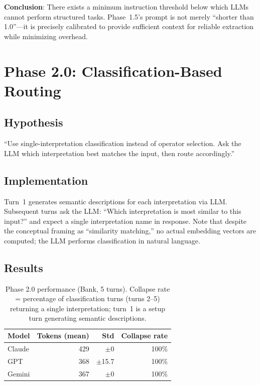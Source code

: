 \documentclass[11pt,a4paper]{article}
\begin{document}
\textbf{Conclusion}: There exists a minimum instruction threshold below which
LLMs cannot perform structured tasks. Phase~1.5's prompt is not merely
``shorter than 1.0''---it is precisely calibrated to provide sufficient context
for reliable extraction while minimizing overhead.

\section{Phase 2.0: Classification-Based Routing}
\label{sec:phase2_0}

\subsection{Hypothesis}

``Use single-interpretation classification instead of operator selection. Ask the LLM
which interpretation best matches the input, then route accordingly.''

\subsection{Implementation}

Turn~1 generates semantic descriptions for each interpretation via LLM.
Subsequent turns ask the LLM: ``Which interpretation is most similar to
this input?'' and expect a single interpretation name in response. Note that
despite the conceptual framing as ``similarity matching,'' no actual embedding
vectors are computed; the LLM performs classification in natural language.

\subsection{Results}

\begin{table}[ht]
\centering
\begin{tabular}{lrrr}
\toprule
\textbf{Model} & \textbf{Tokens (mean)} & \textbf{Std} & \textbf{Collapse rate} \\
\midrule
Claude & 429 & $\pm$0 & 100\% \\
GPT & 368 & $\pm$15.7 & 100\% \\
Gemini & 367 & $\pm$0 & 100\% \\
\bottomrule
\end{tabular}
\caption{Phase 2.0 performance (Bank, 5 turns). Collapse rate = percentage of
classification turns (turns 2--5) returning a single interpretation; turn~1 is a
setup turn generating semantic descriptions.}
\label{tab:phase2_0}
\end{table}
\end{document}
